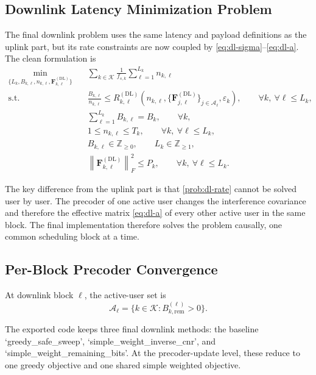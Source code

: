 \documentclass[11pt]{article}
\newcommand{\Kset}{\mathcal{K}}
\newcommand{\Aset}{\mathcal{A}}
\newcommand{\F}{\mathbf{F}}
\newcommand{\norm}[1]{\left\lVert #1 \right\rVert}
\newcommand{\DL}{\mathrm{DL}}
\begin{document}
\subsection{Downlink Latency Minimization Problem}
The final downlink problem uses the same latency and payload definitions as the uplink part, but its rate constraints are now coupled by \eqref{eq:dl-sigma}--\eqref{eq:dl-a}. The clean formulation is
\begin{subequations}
\begin{align}
\min_{\{L_k,B_{k,\ell},n_{k,\ell},\F_{k,\ell}^{(\DL)}\}}
\quad
&
\sum_{k \in \Kset}\frac{1}{f_{s,k}}\sum_{\ell=1}^{L_k} n_{k,\ell}
\label{prob:dl-main-obj}
\\
\text{s.t.}\quad
&
\frac{B_{k,\ell}}{n_{k,\ell}}
\le
R_{k,\ell}^{(\DL)}\!\left(
n_{k,\ell},
\{\F_{j,\ell}^{(\DL)}\}_{j \in \Aset_\ell},
\varepsilon_k
\right),
\qquad
\forall k,\ \forall \ell \le L_k,
\label{prob:dl-rate}
\\
&
\sum_{\ell=1}^{L_k} B_{k,\ell} = B_k,
\qquad
\forall k,
\label{prob:dl-payload}
\\
&
1 \le n_{k,\ell} \le T_k,
\qquad
\forall k,\ \forall \ell \le L_k,
\label{prob:dl-n}
\\
&
B_{k,\ell} \in \mathbb{Z}_{\ge 0},
\qquad
L_k \in \mathbb{Z}_{\ge 1},
\label{prob:dl-int}
\\
&
\norm{\F_{k,\ell}^{(\DL)}}_F^2 \le P_k,
\qquad
\forall k,\ \forall \ell \le L_k.
\label{prob:dl-power}
\end{align}
\end{subequations}

The key difference from the uplink part is that \eqref{prob:dl-rate} cannot be solved user by user. The precoder of one active user changes the interference covariance and therefore the effective matrix \eqref{eq:dl-a} of every other active user in the same block. The final implementation therefore solves the problem causally, one common scheduling block at a time.

\subsection{Per-Block Precoder Convergence}
At downlink block $\ell$, the active-user set is
\begin{equation}
\Aset_\ell = \{k \in \Kset : B_{k,\mathrm{rem}}^{(\ell)} > 0\}.
\label{eq:active-set}
\end{equation}

The exported code keeps three final downlink methods: the baseline `greedy\_safe\_sweep', `simple\_weight\_inverse\_cnr', and `simple\_weight\_remaining\_bits'. At the precoder-update level, these reduce to one greedy objective and one shared simple weighted objective.
\end{document}
